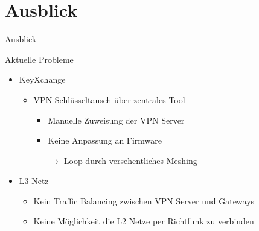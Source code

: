 \section{Ausblick}
\begin{frame}{}
    \begin{center}
        Ausblick
     \end{center}
\end{frame}

\begin{frame}{Aktuelle Probleme}
    \begin{itemize}
        \item KeyXchange
        \begin{itemize}
            \item VPN Schlüsseltausch über zentrales Tool
            \begin{itemize}
                \item Manuelle Zuweisung der VPN Server
                \item Keine Anpassung an Firmware
                \item[$\rightarrow$] Loop durch versehentliches Meshing
            \end{itemize}
        \end{itemize}
        \item L3-Netz
        \begin{itemize}
            \item Kein Traffic Balancing zwischen VPN Server und Gateways
            \item Keine Möglichkeit die L2 Netze per Richtfunk zu verbinden
        \end{itemize}
    \end{itemize}
\end{frame}

